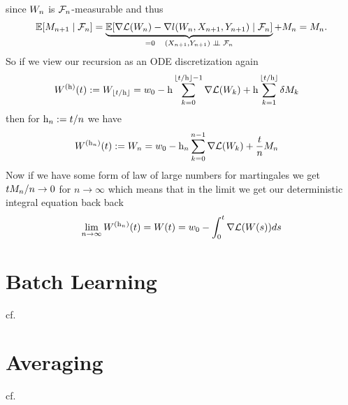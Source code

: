 since \(W_n\) is \(\mathcal{F}_n\)-measurable and thus
\begin{align*}
	\mathbb{E}[M_{n+1}\mid \mathcal{F}_n]
	= \underbrace{\mathbb{E}[\nabla\mathcal{L}(W_n) - \nabla l(W_n, X_{n+1}, Y_{n+1})\mid \mathcal{F}_n]}_{
		=0 \quad (X_{n+1},Y_{n+1}) \mathrel{\;\perp \!\!\! \perp\;} \mathcal{F}_n
	} + M_n
	= M_n.
\end{align*}
%
So if we view our recursion as an ODE discretization again
%
\begin{align*}
	W^{(\text{h})}(t) &:= W_{\lfloor t/\text{h}\rfloor}
	= w_0 - \text{h}\sum_{k=0}^{\lfloor t/\text{h}\rfloor-1}\nabla\mathcal{L}(W_k)
	+ \text{h}\sum_{k=1}^{\lfloor t/\text{h}\rfloor}\delta M_k
\end{align*}
%
then for \(\text{h}_n := t/n\) we have
\begin{align*}
	W^{(\text{h}_n)}(t) &:= W_n
	= w_0 - \text{h}_n\sum_{k=0}^{n-1}\nabla\mathcal{L}(W_k)
	+\frac{t}{n}M_n
\end{align*}
Now if we have some form of law of large numbers for martingales we get
\(tM_n/n\to 0\) for \(n\to\infty\) which means that in the limit we
get our deterministic integral equation back back
\begin{align*}
	\lim_{n\to\infty}W^{(\text{h}_n)}(t) = W(t)
	= w_0 - \int_0^t \nabla\mathcal{L}(W(s))ds
\end{align*}

\textcite{nemirovskiRobustStochasticApproximation2009}
\textcite{simsekliTailIndexAnalysisStochastic2019}

\section{Batch Learning}

cf. \cite{hardtTrainFasterGeneralize2016} \cite{hofferTrainLongerGeneralize2018}

\section{Averaging}

cf. \cite{bachNonstronglyconvexSmoothStochastic2013}


\endinput
